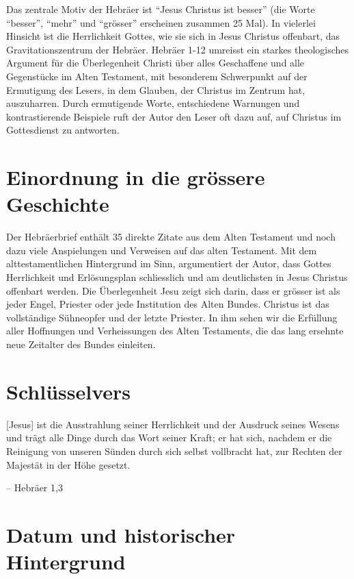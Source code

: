 \documentclass[
  12pt,
]{krantz}
\makeatletter
\newenvironment{kframe}{%
\medskip{}
\setlength{\fboxsep}{.8em}
 \def\at@end@of@kframe{}%
 \ifinner\ifhmode%
  \def\at@end@of@kframe{\end{minipage}}%
  \begin{minipage}{\columnwidth}%
 \fi\fi%
 \def\FrameCommand##1{\hskip\@totalleftmargin \hskip-\fboxsep
 \colorbox{shadecolor}{##1}\hskip-\fboxsep
     \hskip-\linewidth \hskip-\@totalleftmargin \hskip\columnwidth}%
 \MakeFramed {\advance\hsize-\width
   \@totalleftmargin\z@ \linewidth\hsize
   \@setminipage}}%
 {\par\unskip\endMakeFramed%
 \at@end@of@kframe}
\newenvironment{rmdblock}[1]
  {
  \begin{itemize}
  \renewcommand{\labelitemi}{
    \raisebox{-.7\height}[0pt][0pt]{
      {\setkeys{Gin}{width=3em,keepaspectratio}\texttt{[image: img/\#1]}}
    }
  }
  \setlength{\fboxsep}{1em}
  \begin{kframe}
  \item
  }
  {
  \end{kframe}
  \end{itemize}
  }
\newenvironment{rmdquote}
  {\begin{rmdblock}{quote}}
  {\end{rmdblock}}
\makeatother
\begin{document}
Das zentrale Motiv der Hebräer ist ``Jesus Christus ist besser'' (die Worte ``besser'', ``mehr'' und ``grösser'' erscheinen zusammen 25 Mal). In vielerlei Hinsicht ist die Herrlichkeit Gottes, wie sie sich in Jesus Christus offenbart, das Gravitationszentrum der Hebräer. Hebräer 1-12 umreisst ein starkes theologisches Argument für die Überlegenheit Christi über alles Geschaffene und alle Gegenstücke im Alten Testament, mit besonderem Schwerpunkt auf der Ermutigung des Lesers, in dem Glauben, der Christus im Zentrum hat, auszuharren. Durch ermutigende Worte, entschiedene Warnungen und kontrastierende Beispiele ruft der Autor den Leser oft dazu auf, auf Christus im Gottesdienst zu antworten.

\hypertarget{einordnung-in-die-gruxf6ssere-geschichte}{%
\section{Einordnung in die grössere Geschichte}\label{einordnung-in-die-gruxf6ssere-geschichte}}

Der Hebräerbrief enthält 35 direkte Zitate aus dem Alten Testament und noch dazu viele Anspielungen und Verweisen auf das alten Testament. Mit dem alttestamentlichen Hintergrund im Sinn, argumentiert der Autor, dass Gottes Herrlichkeit und Erlösungsplan schliesslich und am deutlichsten in Jesus Christus offenbart werden. Die Überlegenheit Jesu zeigt sich darin, dass er grösser ist als jeder Engel, Priester oder jede Institution des Alten Bundes. Christus ist das vollständige Sühneopfer und der letzte Priester. In ihm sehen wir die Erfüllung aller Hoffnungen und Verheissungen des Alten Testaments, die das lang ersehnte neue Zeitalter des Bundes einleiten.

\hypertarget{schluxfcsselvers}{%
\section{Schlüsselvers}\label{schluxfcsselvers}}

\begin{rmdquote}
{[}Jesus{]} ist die Ausstrahlung seiner Herrlichkeit und der Ausdruck
seines Wesens und trägt alle Dinge durch das Wort seiner Kraft; er hat
sich, nachdem er die Reinigung von unseren Sünden durch sich selbst
vollbracht hat, zur Rechten der Majestät in der Höhe gesetzt.

-- Hebräer 1,3
\end{rmdquote}

\hypertarget{datum-und-historischer-hintergrund}{%
\section{Datum und historischer Hintergrund}\label{datum-und-historischer-hintergrund}}
\end{document}
